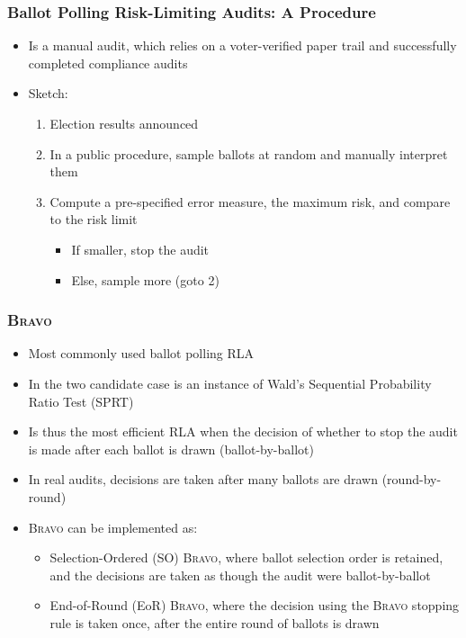 \documentclass{beamer}
\newcommand{\BRAVO}{\textsc{Bravo}\xspace}
\begin{document}
\begin{frame}
\frametitle{Ballot Polling Risk-Limiting Audits: A Procedure}

\begin{itemize}
\item Is a manual audit, which relies on a voter-verified paper trail and successfully completed compliance audits
\pause 
\item Sketch:
\begin{enumerate}
\item Election results announced
\pause 
\item In a public procedure, sample ballots at random and manually interpret them
\pause 
\item Compute a pre-specified error measure, the maximum risk, and compare to the risk limit
\begin{itemize}
\item If smaller, stop the audit
\item Else, sample more (goto 2)
\end{itemize}
\end{enumerate}
\end{itemize}
\end{frame}

\begin{frame}
\frametitle{\BRAVO}
\begin{itemize}
\item Most commonly used ballot polling RLA
\pause 
\item In the two candidate case is an instance of Wald's Sequential Probability Ratio Test (SPRT)
\pause 
\item Is thus the most efficient RLA when 
the decision of whether to stop the audit is made after each ballot is drawn (ballot-by-ballot)
\pause 
\item In real audits, decisions are taken after many ballots are drawn (round-by-round)
\pause 
\item \BRAVO can be implemented as:
\begin{itemize}
\item Selection-Ordered (SO) \BRAVO, 
where ballot selection order is retained, and the decisions are taken as though the audit were ballot-by-ballot
\item End-of-Round (EoR) \BRAVO, where
the decision using the \BRAVO stopping rule is taken once, after the entire round of ballots is drawn
\end{itemize}
\end{itemize}
\end{frame}
\end{document}
